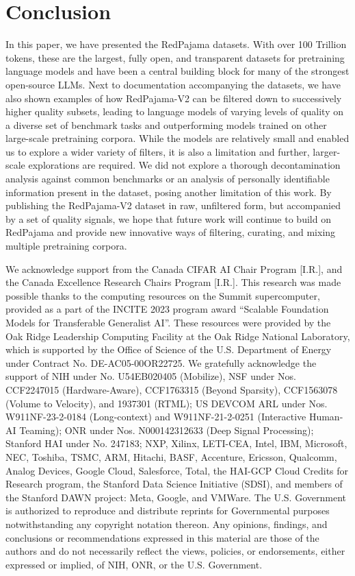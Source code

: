 \documentclass{article}
\begin{document}
\section{Conclusion}
\label{sec:conclusion}
In this paper, we have presented the RedPajama datasets. With over 100 Trillion tokens, these are the largest, fully open, and transparent datasets for pretraining language models and have been a central building block for many of the strongest open-source LLMs. Next to documentation accompanying the datasets, we have also shown examples of how RedPajama-V2 can be filtered down to successively higher quality subsets, leading to language models of varying levels of quality on a diverse set of benchmark tasks and outperforming models trained on other large-scale pretraining corpora. While the models are relatively small and enabled us to explore a wider variety of filters, it is also a limitation and further, larger-scale explorations are required. We did not explore a thorough decontamination analysis against common benchmarks or an analysis of personally identifiable information present in the dataset, posing another limitation of this work. By publishing the RedPajama-V2 dataset in raw, unfiltered form, but accompanied by a set of quality signals, we hope that future work will continue to build on RedPajama and provide new innovative ways of filtering, curating, and mixing multiple pretraining corpora.



\begin{ack}
We acknowledge support from the Canada CIFAR AI Chair Program [I.R.], and the Canada Excellence Research Chairs Program [I.R.]. 
This research was made possible thanks to the computing resources on the Summit supercomputer, provided as a part of the INCITE 2023 program award “Scalable Foundation Models for Transferable Generalist AI”. These resources were provided by the Oak Ridge Leadership Computing Facility at the Oak Ridge National Laboratory, which is supported by the Office of Science of the U.S. Department of Energy under Contract No. DE-AC05-00OR22725. 
We gratefully acknowledge the support of NIH under No. U54EB020405 (Mobilize), NSF under Nos. CCF2247015 (Hardware-Aware), CCF1763315 (Beyond Sparsity), CCF1563078 (Volume to Velocity), and 1937301 (RTML); US DEVCOM ARL under Nos. W911NF-23-2-0184 (Long-context) and W911NF-21-2-0251 (Interactive Human-AI Teaming); ONR under Nos. N000142312633 (Deep Signal Processing); Stanford HAI under No. 247183; NXP, Xilinx, LETI-CEA, Intel, IBM, Microsoft, NEC, Toshiba, TSMC, ARM, Hitachi, BASF, Accenture, Ericsson, Qualcomm, Analog Devices, Google Cloud, Salesforce, Total, the HAI-GCP Cloud Credits for Research program,  the Stanford Data Science Initiative (SDSI), and members of the Stanford DAWN project: Meta, Google, and VMWare. The U.S. Government is authorized to reproduce and distribute reprints for Governmental purposes notwithstanding any copyright notation thereon. Any opinions, findings, and conclusions or recommendations expressed in this material are those of the authors and do not necessarily reflect the views, policies, or endorsements, either expressed or implied, of NIH, ONR, or the U.S. Government. 
\end{ack}
\end{document}
